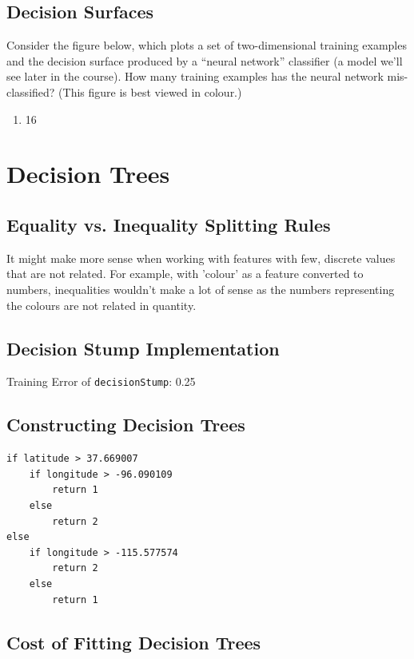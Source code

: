 \documentclass{article}
\def\blu#1{{\color{blu}#1}}
\begin{document}
\subsection{Decision Surfaces}

Consider the figure below, which plots a set of two-dimensional training examples and the decision surface produced by a ``neural network'' classifier (a model we'll see later in the course).
\blu{How many training examples has the neural network mis-classified?} (This figure is best viewed in colour.)

\begin{enumerate}
\item 16
\end{enumerate}

\section{Decision Trees}


\subsection{Equality vs. Inequality Splitting Rules}

It might make more sense when working with features with few, discrete values that are not related. For example, with 'colour' as a feature converted to numbers, inequalities wouldn't make a lot of sense as the numbers representing the colours are not related in quantity.

\subsection{Decision Stump Implementation}

Training Error of \texttt{decisionStump}: 0.25

\subsection{Constructing Decision Trees}
\begin{verbatim}
if latitude > 37.669007
    if longitude > -96.090109
        return 1
    else
        return 2
else
    if longitude > -115.577574
        return 2
    else
        return 1
\end{verbatim}



\subsection{Cost of Fitting Decision Trees}
\end{document}
